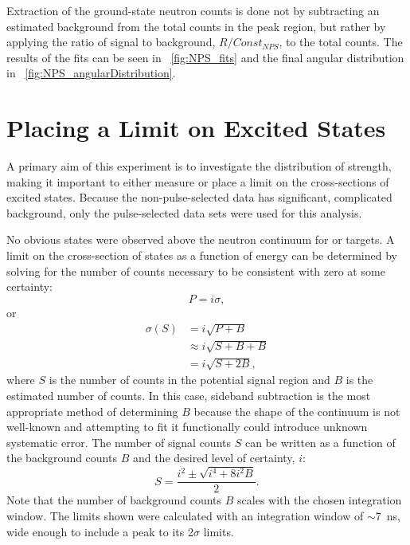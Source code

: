 Extraction of the ground-state neutron counts is done not by subtracting an estimated background from the total counts in the peak region, but rather by applying the ratio of signal to background, $R/Const_{NPS}$, to the total counts.  The results of the fits can be seen in {\fig}~\ref{fig:NPS_fits} and the final angular distribution in {\fig}~\ref{fig:NPS_angularDistribution}.


\section{Placing a Limit on Excited \zp States}

A primary aim of this experiment is to investigate the distribution of \zp strength, making it important to either measure or place a limit on the cross-sections of excited \zp states.  Because the non-pulse-selected data has significant, complicated background, only the pulse-selected data sets were used for this analysis.  

No obvious \zp states were observed above the neutron continuum for  or  targets.  A limit on the cross-section of \zp states as a function of energy can be determined by solving for the number of counts necessary to be consistent with zero at some certainty:
\begin{equation}
P = i\sigma,
\end{equation}
or
\begin{align}
\sigma(S) &= i\sqrt{P+B} \\
               &\approx i\sqrt{S+B+B} \\
               &=i\sqrt{S+2B},
\end{align}
where $S$ is the number of counts in the potential signal region and $B$ is the estimated number of counts.  In this case, sideband subtraction is the most appropriate method of determining $B$ because the shape of the continuum is not well-known and attempting to fit it functionally could introduce unknown systematic error.  The number of signal counts $S$ can be written as a function of the background counts $B$ and the desired level of certainty, $i$:
\begin{equation}
S = \frac{i^2 \pm \sqrt{i^4 + 8i^2B}}{2}.
\end{equation}
Note that the number of background counts $B$ scales with the chosen integration window.  The limits shown were calculated with an integration window of $\sim$7~ns, wide enough to include a peak to its 2$\sigma$ limits.

